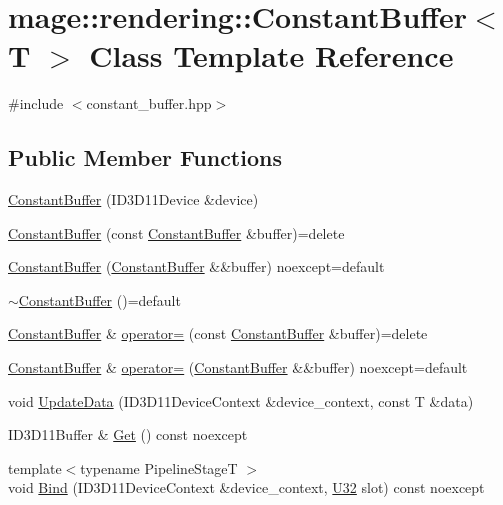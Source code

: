 \hypertarget{classmage_1_1rendering_1_1_constant_buffer}{}\section{mage\+:\+:rendering\+:\+:Constant\+Buffer$<$ T $>$ Class Template Reference}
\label{classmage_1_1rendering_1_1_constant_buffer}


{\ttfamily \#include $<$constant\+\_\+buffer.\+hpp$>$}

\subsection*{Public Member Functions}
\begin{DoxyCompactItemize}
\item 
\mbox{\hyperlink{classmage_1_1rendering_1_1_constant_buffer_af282b97fba72826646c1bc31d8953b9e}{Constant\+Buffer}} (I\+D3\+D11\+Device \&device)
\item 
\mbox{\hyperlink{classmage_1_1rendering_1_1_constant_buffer_aacc1ace626cdf1fbeb2d51d7789495da}{Constant\+Buffer}} (const \mbox{\hyperlink{classmage_1_1rendering_1_1_constant_buffer}{Constant\+Buffer}} \&buffer)=delete
\item 
\mbox{\hyperlink{classmage_1_1rendering_1_1_constant_buffer_a1c1c73d617245d7dead836b0d3a00a6f}{Constant\+Buffer}} (\mbox{\hyperlink{classmage_1_1rendering_1_1_constant_buffer}{Constant\+Buffer}} \&\&buffer) noexcept=default
\item 
\mbox{\hyperlink{classmage_1_1rendering_1_1_constant_buffer_af75271b7a5550583732e0575b576f088}{$\sim$\+Constant\+Buffer}} ()=default
\item 
\mbox{\hyperlink{classmage_1_1rendering_1_1_constant_buffer}{Constant\+Buffer}} \& \mbox{\hyperlink{classmage_1_1rendering_1_1_constant_buffer_ac8770d151c9c8bdb27babdb060fd7f4c}{operator=}} (const \mbox{\hyperlink{classmage_1_1rendering_1_1_constant_buffer}{Constant\+Buffer}} \&buffer)=delete
\item 
\mbox{\hyperlink{classmage_1_1rendering_1_1_constant_buffer}{Constant\+Buffer}} \& \mbox{\hyperlink{classmage_1_1rendering_1_1_constant_buffer_adbd72a5aa7eab5461eed06c611dd908c}{operator=}} (\mbox{\hyperlink{classmage_1_1rendering_1_1_constant_buffer}{Constant\+Buffer}} \&\&buffer) noexcept=default
\item 
void \mbox{\hyperlink{classmage_1_1rendering_1_1_constant_buffer_a4289215f38cf17e767e438021894a140}{Update\+Data}} (I\+D3\+D11\+Device\+Context \&device\+\_\+context, const T \&data)
\item 
I\+D3\+D11\+Buffer \& \mbox{\hyperlink{classmage_1_1rendering_1_1_constant_buffer_a0020fcf17b61d277430c572df44992b5}{Get}} () const noexcept
\item 
{\footnotesize template$<$typename Pipeline\+StageT $>$ }\\void \mbox{\hyperlink{classmage_1_1rendering_1_1_constant_buffer_a49c3982ed5b6a01ddc8cadd509eff7f8}{Bind}} (I\+D3\+D11\+Device\+Context \&device\+\_\+context, \mbox{\hyperlink{namespacemage_a41c104c036fba3756a74e19f793eeaa1}{U32}} slot) const noexcept
\end{DoxyCompactItemize}

